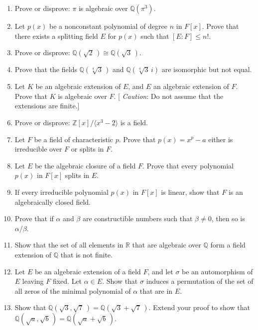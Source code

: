 {\begin{enumerate}
\item
Prove or disprove: $\pi$ is algebraic over ${\mathbb Q}(\pi^3)$.


\item
Let $p(x)$ be a nonconstant polynomial of degree $n$ in $F[x]$.  Prove
that there exists a splitting field $E$ for $p(x)$ such that $[E : F]
\leq n!$. 


\item
Prove or disprove: ${\mathbb Q}( \sqrt{2}\, ) \cong {\mathbb Q}( \sqrt{3}\, )$.


\item
Prove that the fields ${\mathbb Q}(\sqrt[4]{3}\, )$ and ${\mathbb
Q}(\sqrt[4]{3}\, i)$ are isomorphic but not equal.


\item
Let $K$ be an algebraic extension of $E$, and $E$ an algebraic
extension of $F$. Prove that $K$ is algebraic over $F$. [{\em
Caution}: Do not assume that the extensions are finite.]


\item
Prove or disprove: ${\mathbb Z}[x] / \langle x^3 -2 \rangle$ is a field.


\item
Let $F$ be a field of characteristic $p$. Prove that $p(x) = x^p - a$
either is irreducible over $F$ or splits in $F$. 


\item
Let $E$ be the algebraic closure of a field $F$. Prove that every
polynomial $p(x)$ in $F[x]$ splits in $E$.


\item
If every irreducible polynomial $p(x)$ in $F[x]$ is linear, show that
$F$ is an algebraically closed field.


\item
Prove that if $\alpha$ and $\beta$ are constructible numbers such that
$\beta \neq 0$, then so is $\alpha / \beta$. 


\item
Show that the set of all elements in ${\mathbb R}$ that are algebraic 
over ${\mathbb Q}$ form a field extension of ${\mathbb Q}$ that is not
finite. 

 
\item
Let $E$ be an algebraic extension of a field $F$, and let $\sigma$ be
an automorphism of $E$ leaving $F$ fixed. Let $\alpha \in E$. Show
that $\sigma$ induces a permutation of the set of all zeros of the
minimal polynomial of $\alpha$ that are in $E$. 

 
\item
Show that ${\mathbb Q}( \sqrt{3}, \sqrt{7}\, ) = {\mathbb Q}( \sqrt{3} +
\sqrt{7}\, )$.  Extend your proof to show that ${\mathbb Q}( \sqrt{a},
\sqrt{b}\, ) = {\mathbb Q}( \sqrt{a} + \sqrt{b}\, )$. 
 


\end{enumerate}}
